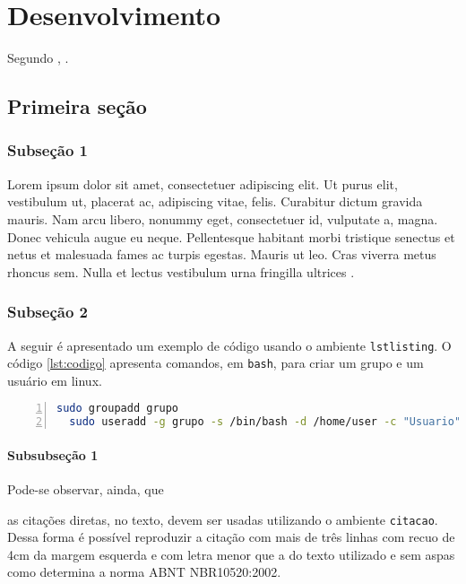 %

\chapter{Desenvolvimento}
Segundo , \lipsum[2].

\section{Primeira seção}
\lipsum[4]

\subsection{Subseção 1}
Lorem ipsum dolor sit amet, consectetuer adipiscing elit. Ut purus elit, vestibulum ut, placerat ac,
adipiscing vitae, felis. Curabitur dictum gravida mauris. Nam arcu libero, nonummy eget, consectetuer
id, vulputate a, magna. Donec vehicula augue eu neque. Pellentesque habitant morbi tristique senectus
et netus et malesuada fames ac turpis egestas. Mauris ut leo. Cras viverra metus rhoncus sem. Nulla
et lectus vestibulum urna fringilla ultrices \cite{2007_montebelo}.

\subsection{Subseção 2}
\lipsum[3]

A seguir é apresentado um exemplo de código usando o ambiente \texttt{lstlisting}. O código \ref{lst:codigo} apresenta comandos, em \texttt{bash}, para criar um grupo e um usuário em linux.
\begin{lstlisting}[language=bash, numbers=left, caption={Exemplo de código.}, label=lst:codigo]
  sudo groupadd grupo
  sudo useradd -g grupo -s /bin/bash -d /home/user -c "Usuario" -m user
\end{lstlisting}

\subsubsection{Subsubseção 1}
Pode-se observar, ainda, que
\begin{citacao}
	as citações diretas, no texto, devem ser usadas utilizando o ambiente \texttt{citacao}. Dessa forma é possível reproduzir a citação com mais de três linhas com recuo de 4cm da margem esquerda e com letra menor que a do texto utilizado e sem aspas como determina a norma ABNT NBR10520:2002.
\end{citacao}

